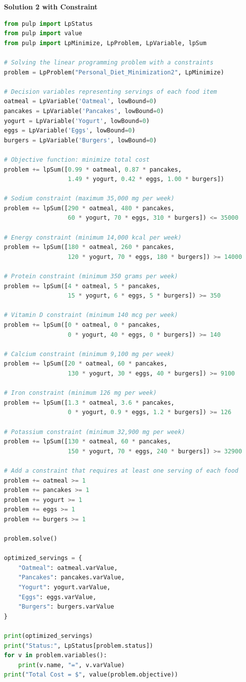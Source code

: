 \documentclass{article}
\begin{document}
\textbf{Solution 2 with Constraint}
\label{Code Snippet - Solution2}
\begin{lstlisting}[language=Python]
from pulp import LpStatus
from pulp import value
from pulp import LpMinimize, LpProblem, LpVariable, lpSum

# Solving the linear programming problem with a constraints 
problem = LpProblem("Personal_Diet_Minimization2", LpMinimize)

# Decision variables representing servings of each food item
oatmeal = LpVariable('Oatmeal', lowBound=0)
pancakes = LpVariable('Pancakes', lowBound=0)
yogurt = LpVariable('Yogurt', lowBound=0)
eggs = LpVariable('Eggs', lowBound=0)
burgers = LpVariable('Burgers', lowBound=0)

# Objective function: minimize total cost
problem += lpSum([0.99 * oatmeal, 0.87 * pancakes, 
                  1.49 * yogurt, 0.42 * eggs, 1.00 * burgers])

# Sodium constraint (maximum 35,000 mg per week)
problem += lpSum([290 * oatmeal, 480 * pancakes, 
                  60 * yogurt, 70 * eggs, 310 * burgers]) <= 35000

# Energy constraint (minimum 14,000 kcal per week)
problem += lpSum([180 * oatmeal, 260 * pancakes, 
                  120 * yogurt, 70 * eggs, 180 * burgers]) >= 14000

# Protein constraint (minimum 350 grams per week)
problem += lpSum([4 * oatmeal, 5 * pancakes, 
                  15 * yogurt, 6 * eggs, 5 * burgers]) >= 350

# Vitamin D constraint (minimum 140 mcg per week)
problem += lpSum([0 * oatmeal, 0 * pancakes, 
                  0 * yogurt, 40 * eggs, 0 * burgers]) >= 140

# Calcium constraint (minimum 9,100 mg per week)
problem += lpSum([20 * oatmeal, 60 * pancakes, 
                  130 * yogurt, 30 * eggs, 40 * burgers]) >= 9100

# Iron constraint (minimum 126 mg per week)
problem += lpSum([1.3 * oatmeal, 3.6 * pancakes, 
                  0 * yogurt, 0.9 * eggs, 1.2 * burgers]) >= 126

# Potassium constraint (minimum 32,900 mg per week)
problem += lpSum([130 * oatmeal, 60 * pancakes, 
                  150 * yogurt, 70 * eggs, 240 * burgers]) >= 32900

# Add a constraint that requires at least one serving of each food 
problem += oatmeal >= 1
problem += pancakes >= 1
problem += yogurt >= 1
problem += eggs >= 1
problem += burgers >= 1

problem.solve()

optimized_servings = {
    "Oatmeal": oatmeal.varValue,
    "Pancakes": pancakes.varValue,
    "Yogurt": yogurt.varValue,
    "Eggs": eggs.varValue,
    "Burgers": burgers.varValue
}

print(optimized_servings)
print("Status:", LpStatus[problem.status])
for v in problem.variables():
    print(v.name, "=", v.varValue)
print("Total Cost = $", value(problem.objective))
\end{lstlisting}
\end{document}
